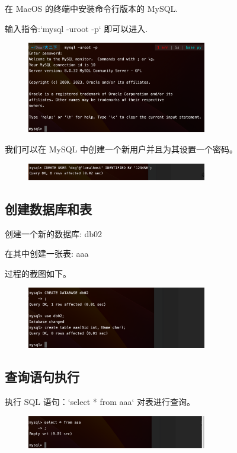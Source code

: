 \documentclass{article}
\begin{document}
在 MacOS 的终端中安装命令行版本的 MySQL.

输入指令:`mysql -uroot -p` 即可以进入. 

\begin{figure}[H]
	\centering
	\includegraphics[width=0.7\textwidth]{lab1/1.png}
	
	\end{figure}


我们可以在 MySQL 中创建一个新用户并且为其设置一个密码。
    \begin{figure}[H]
        \centering
        \includegraphics[width=0.7\textwidth]{lab1/5.png}
        \end{figure}


\subsection{创建数据库和表}

创建一个新的数据库: db02

在其中创建一张表: aaa 

过程的截图如下。

\begin{figure}[H]
    \centering
    \includegraphics[width=0.7\textwidth]{lab1/3.png}
    \end{figure}


\subsection{查询语句执行}

执行 SQL 语句：`select * from aaa` 对表进行查询。

\begin{figure}[H]
    \centering
    \includegraphics[width=0.7\textwidth]{lab1/4.png}
    \end{figure}
\end{document}
